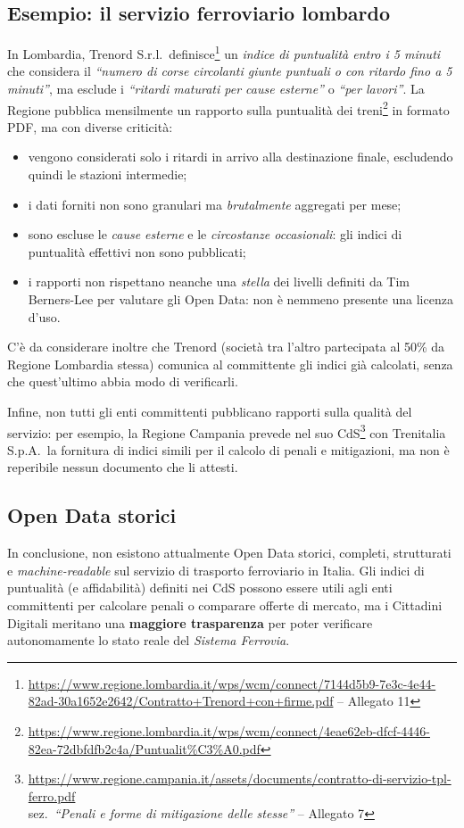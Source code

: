 \documentclass[italian,11pt,a4paper,final]{article}
\begin{document}
	\subsection{Esempio: il servizio ferroviario lombardo}
	In Lombardia, Trenord S.r.l.\ definisce\footnote{\url{https://www.regione.lombardia.it/wps/wcm/connect/7144d5b9-7e3c-4e44-82ad-30a1652e2642/Contratto+Trenord+con+firme.pdf} -- Allegato 11} un \textit{indice di puntualità entro i 5 minuti} che considera il \textit{``numero di corse circolanti giunte puntuali o con ritardo fino a 5 minuti''}, ma esclude i \textit{``ritardi maturati per cause esterne''} o \textit{``per lavori''}. 
	La Regione pubblica mensilmente un rapporto sulla puntualità dei treni\footnote{\url{https://www.regione.lombardia.it/wps/wcm/connect/4eae62eb-dfcf-4446-82ea-72dbfdfb2c4a/Puntualit\%C3\%A0.pdf}} in formato PDF, ma con diverse criticità:
	\begin{itemize}
		\item vengono considerati solo i ritardi in arrivo alla destinazione finale, escludendo quindi le stazioni intermedie;
		\item i dati forniti non sono granulari ma \textit{brutalmente} aggregati per mese;
		\item sono escluse le \textit{cause esterne} e le \textit{circostanze occasionali}: gli indici di puntualità effettivi non sono pubblicati;
		\item i rapporti non rispettano neanche una \textit{stella} dei livelli definiti da Tim Berners-Lee per valutare gli Open Data: non è nemmeno presente una licenza d'uso.
	\end{itemize}
	
	C'è da considerare inoltre che Trenord (società tra l'altro partecipata al 50\% da Regione Lombardia stessa) comunica al committente gli indici già calcolati, senza che quest'ultimo abbia modo di verificarli.
	
	Infine, non tutti gli enti committenti pubblicano rapporti sulla qualità del servizio: per esempio, la Regione Campania prevede nel suo CdS\footnote{
		\url{https://www.regione.campania.it/assets/documents/contratto-di-servizio-tpl-ferro.pdf} \\
		sez.\ \textit{``Penali e forme di mitigazione delle stesse''} -- Allegato 7
	} con Trenitalia S.p.A.\ la fornitura di indici simili per il calcolo di penali e mitigazioni,
	ma non è reperibile nessun documento che li attesti. \\
	
	\subsection{Open Data storici}
	In conclusione, non esistono attualmente Open Data {storici}, completi, strutturati e \textit{machine-readable} sul servizio di trasporto ferroviario in Italia.
	Gli indici di puntualità (e affidabilità) definiti nei CdS possono essere utili agli enti committenti per calcolare penali o comparare offerte di mercato, ma i Cittadini Digitali meritano una \textbf{maggiore trasparenza} per poter verificare autonomamente lo stato reale del \textit{Sistema Ferrovia}.
	
\end{document}
